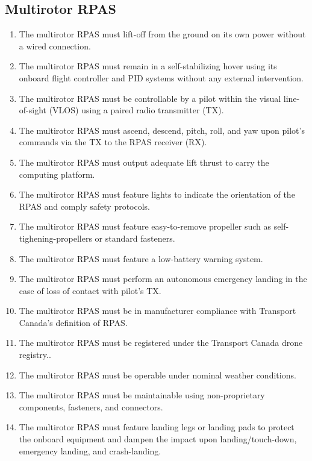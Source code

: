 \documentclass[10pt,letterpaper]{article}
\begin{document}
\subsection{Multirotor RPAS}
\begin{enumerate}[label=F.DR.\arabic*, wide=1cm, widest=3cm, leftmargin=*, font=\bfseries, noitemsep,topsep=0pt, parsep=4pt, partopsep=0pt]
	\item The multirotor RPAS must lift-off from the ground on its own power without a wired connection.
	\item The multirotor RPAS must remain in a self-stabilizing hover using its onboard flight controller and PID systems without any external intervention.
	\item The multirotor RPAS must be controllable by a pilot within the visual line-of-sight (VLOS) using a paired radio transmitter (TX).
	\item The multirotor RPAS must ascend, descend, pitch, roll, and yaw upon pilot's commands via the TX to the RPAS receiver (RX).
	\item The multirotor RPAS must output adequate lift thrust to carry the computing platform.
	\item The multirotor RPAS must feature lights to indicate the orientation of the RPAS and comply safety protocols.
	\item The multirotor RPAS must feature easy-to-remove propeller such as self-tighening-propellers or standard fasteners.
	\item The multirotor RPAS must feature a low-battery warning system.
	\item The multirotor RPAS must perform an autonomous emergency landing in the case of loss of contact with pilot's TX.
	\item The multirotor RPAS must be in manufacturer compliance with Transport Canada's definition of RPAS\cite{tp15263}.
	\item The multirotor RPAS must be registered under the Transport Canada drone registry.\cite{tcdronereg}.
	\item The multirotor RPAS must be operable under nominal weather conditions.
	\item The multirotor RPAS must be maintainable using non-proprietary components, fasteners, and connectors.
	\item The multirotor RPAS must feature landing legs or landing pads to protect the onboard equipment and dampen the impact upon landing/touch-down, emergency landing, and crash-landing.
\end{enumerate}
\end{document}
